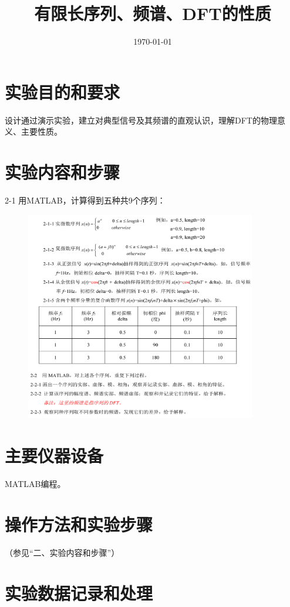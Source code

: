 \documentclass{../source/Experiment}
\title{有限长序列、频谱、DFT的性质}
\date{\today}
\begin{document}
    \makeheader
    \section{实验目的和要求}
    设计通过演示实验，建立对典型信号及其频谱的直观认识，理解DFT的物理意义、主要性质。

    \section{实验内容和步骤}
    2-1 用MATLAB，计算得到五种共9个序列：
    \begin{figure}[H]
        \centering
        \includegraphics[width = 0.90\textwidth]{pic/2.png}
    \end{figure}
    \newpage

    \section{主要仪器设备}
    
    MATLAB编程。

    \section{操作方法和实验步骤}

    （参见“二、实验内容和步骤”）

    \section{实验数据记录和处理}
    
\end{document}
